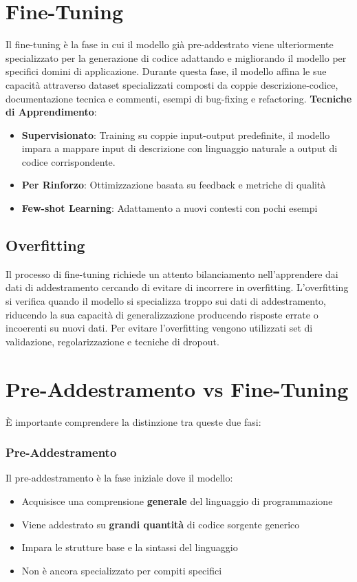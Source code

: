 \documentclass[12pt,a4paper,openright,twoside]{book}
\begin{document}
\section{Fine-Tuning}
Il fine-tuning è la fase in cui il modello già pre-addestrato viene ulteriormente specializzato per la generazione di codice adattando e migliorando il modello per specifici domini di applicazione.
Durante questa fase, il modello affina le sue capacità attraverso dataset specializzati composti da coppie descrizione-codice, documentazione tecnica e commenti, esempi di bug-fixing e refactoring.
\textbf{Tecniche di Apprendimento}:
    \begin{itemize}
        \item \textbf{Supervisionato}: Training su coppie input-output predefinite, il modello impara a mappare input di descrizione con linguaggio naturale a output di codice corrispondente.
        \item \textbf{Per Rinforzo}: Ottimizzazione basata su feedback e metriche di qualità
        \item \textbf{Few-shot Learning}: Adattamento a nuovi contesti con pochi esempi
    \end{itemize}

\subsection{Overfitting}
Il processo di fine-tuning richiede un attento bilanciamento nell'apprendere dai dati di addestramento cercando di evitare di incorrere in overfitting.
L'overfitting si verifica quando il modello si specializza troppo sui dati di addestramento, riducendo la sua capacità di generalizzazione producendo risposte errate o incoerenti su nuovi dati.
Per evitare l'overfitting vengono utilizzati set di validazione, regolarizzazione e tecniche di dropout.

\section{Pre-Addestramento vs Fine-Tuning}
È importante comprendere la distinzione tra queste due fasi:
\subsubsection{Pre-Addestramento}
Il pre-addestramento è la fase iniziale dove il modello:
\begin{itemize}
    \item Acquisisce una comprensione \textbf{generale} del linguaggio di programmazione
    \item Viene addestrato su \textbf{grandi quantità} di codice sorgente generico
    \item Impara le strutture base e la sintassi del linguaggio
    \item Non è ancora specializzato per compiti specifici
\end{itemize}
\end{document}
